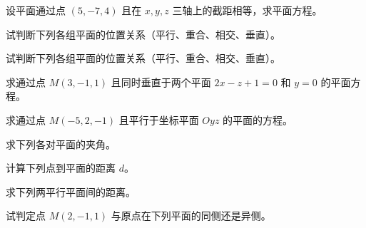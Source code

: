 \newpage
\noindent\begin{minipage}{\textwidth}
设平面通过点 $(5,-7,4)$ 且在 $x,y,z$ 三轴上的截距相等，求平面方程。
\end{minipage}\par\vfill
\noindent\begin{minipage}{\textwidth}
试判断下列各组平面的位置关系（平行、重合、相交、垂直）。
\end{minipage}\par\vfill
\noindent\begin{minipage}{\textwidth}
试判断下列各组平面的位置关系（平行、重合、相交、垂直）。
\end{minipage}\par\vfill
\noindent\begin{minipage}{\textwidth}
求通过点 $M(3,-1,1)$ 且同时垂直于两个平面 $2x-z+1=0$ 和 $y=0$ 的平面方程。
\end{minipage}\par\vfill
\newpage
\noindent\begin{minipage}{\textwidth}
求通过点 $M(-5,2,-1)$ 且平行于坐标平面 $Oyz$ 的平面的方程。
\end{minipage}\par\vfill
\noindent\begin{minipage}{\textwidth}
求下列各对平面的夹角。
\end{minipage}\par\vfill
\noindent\begin{minipage}{\textwidth}
计算下列点到平面的距离 $d$。
\end{minipage}\par\vfill
\noindent\begin{minipage}{\textwidth}
求下列两平行平面间的距离。
\end{minipage}\par\vfill
\newpage
\noindent\begin{minipage}{\textwidth}
试判定点 $M(2,-1,1)$ 与原点在下列平面的同侧还是异侧。
\end{minipage}\par\vfill
